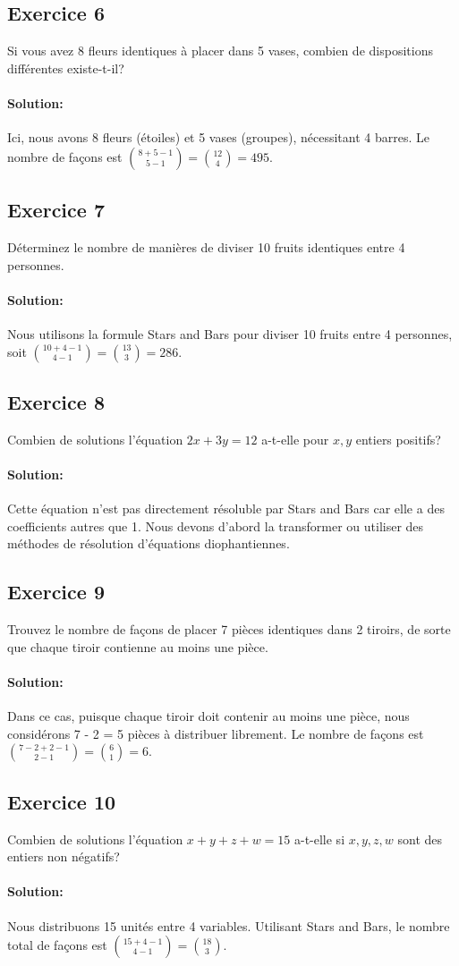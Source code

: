 \documentclass{article}
\begin{document}
\subsection{Exercice 6}
Si vous avez 8 fleurs identiques à placer dans 5 vases, combien de dispositions différentes existe-t-il?
\paragraph{Solution:}
Ici, nous avons 8 fleurs (étoiles) et 5 vases (groupes), nécessitant 4 barres. Le nombre de façons est \(\binom{8 + 5 - 1}{5 - 1} = \binom{12}{4} = 495\).

\subsection{Exercice 7}
Déterminez le nombre de manières de diviser 10 fruits identiques entre 4 personnes.
\paragraph{Solution:}
Nous utilisons la formule Stars and Bars pour diviser 10 fruits entre 4 personnes, soit \(\binom{10 + 4 - 1}{4 - 1} = \binom{13}{3} = 286\).

\subsection{Exercice 8}
Combien de solutions l'équation \( 2x + 3y = 12 \) a-t-elle pour \( x, y \) entiers positifs?
\paragraph{Solution:}
Cette équation n'est pas directement résoluble par Stars and Bars car elle a des coefficients autres que 1. Nous devons d'abord la transformer ou utiliser des méthodes de résolution d'équations diophantiennes.

\subsection{Exercice 9}
Trouvez le nombre de façons de placer 7 pièces identiques dans 2 tiroirs, de sorte que chaque tiroir contienne au moins une pièce.
\paragraph{Solution:}
Dans ce cas, puisque chaque tiroir doit contenir au moins une pièce, nous considérons 7 - 2 = 5 pièces à distribuer librement. Le nombre de façons est \(\binom{7 - 2 + 2 - 1}{2 - 1} = \binom{6}{1} = 6\).

\subsection{Exercice 10}
Combien de solutions l'équation \( x + y + z + w = 15 \) a-t-elle si \( x, y, z, w \) sont des entiers non négatifs?
\paragraph{Solution:}
Nous distribuons 15 unités entre 4 variables. Utilisant Stars and Bars, le nombre total de façons est \(\binom{15 + 4 - 1}{4 - 1} = \binom{18}{3}\).
\end{document}
